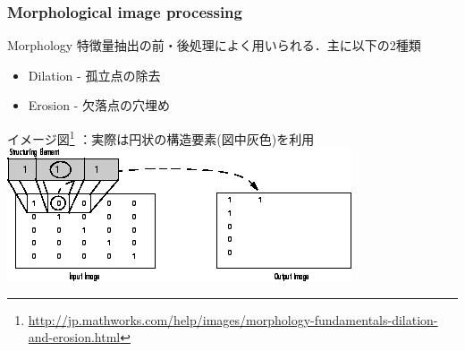 \begin{frame}\frametitle{Morphological image processing}
\begin{block}{Morphology}
特徴量抽出の前・後処理によく用いられる．主に以下の2種類
\begin{itemize}
    \item Dilation - 孤立点の除去
    \item Erosion - 欠落点の穴埋め
\end{itemize}
\end{block}

イメージ図\footnote
{\url{http://jp.mathworks.com/help/images/morphology-fundamentals-dilation-and-erosion.html}}
：実際は円状の構造要素(図中灰色)を利用
\includegraphics[scale=0.4]{figure/morph.png}
\end{frame}
